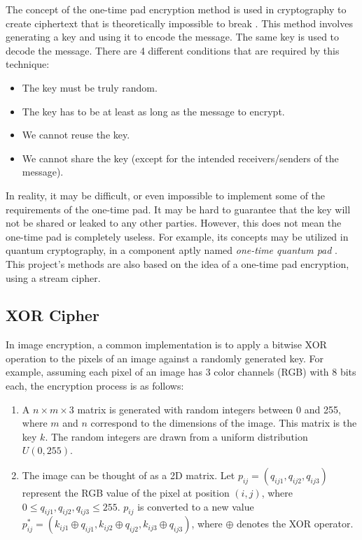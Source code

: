 \documentclass[10pt]{article}
\begin{document}
    
    The concept of the one-time pad encryption method is used in cryptography to create ciphertext that is theoretically impossible to break \cite{Bellovin}. This method involves generating a key and using it to encode the message. The same key is used to decode the message. There are 4 different conditions that are required by this technique:
    \begin{itemize}
        \item The key must be truly random.
        \item The key has to be at least as long as the message to encrypt.
        \item We cannot reuse the key.
        \item We cannot share the key (except for the intended receivers/senders of the message).
    \end{itemize}

     In reality, it may be difficult, or even impossible to implement some of the requirements of the one-time pad. It may be hard to guarantee that the key will not be shared or leaked to any other parties. However, this does not mean the one-time pad is completely useless. For example, its concepts may be utilized in quantum cryptography, in a component aptly named \textit{one-time quantum pad} \cite{Brassard2005}.\\
     
     This project's methods are also based on the idea of a one-time pad encryption, using a stream cipher.

   
    
    \subsection{XOR Cipher} \label{ssec:n1}
    
     In image encryption, a common implementation is to apply a bitwise XOR operation to the pixels of an image against a randomly generated key. For example, assuming each pixel of an image has 3 color channels (RGB) with 8 bits each, the encryption process is as follows:
    
    \begin{enumerate}
        \item A $n\times m\times3$ matrix is generated with random integers between 0 and 255, where $m$ and $n$ correspond to the dimensions of the image. This matrix is the key $k$. The random integers are drawn from a uniform distribution $U(0, 255)$.
        \item The image can be thought of as a 2D matrix. Let $p_{ij} = (q_{ij1}, q_{ij2}, q_{ij3})$  represent the RGB value of the pixel at position $(i, j)$, where $0 \leq q_{ij1}, q_{ij2}, q_{ij3} \leq 255$. $p_{ij}$ is converted to a new value $p_{ij}^* = (k_{ij1}\oplus q_{ij1}, k_{ij2}\oplus q_{ij2}, k_{ij3}\oplus q_{ij3} )$, where $\oplus$ denotes the XOR operator.
    \end{enumerate}
    
\end{document}
